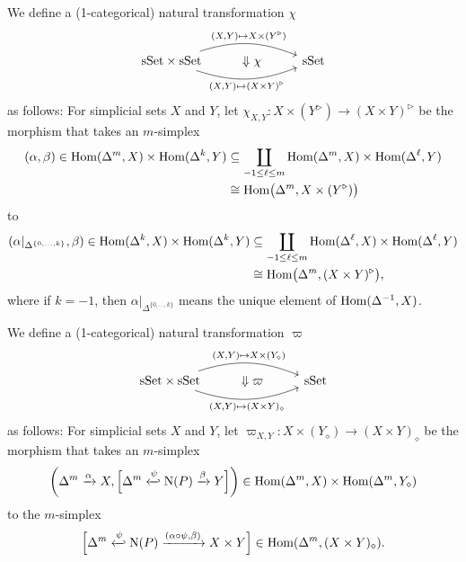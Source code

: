 \documentclass{tac}
\newcommand{\tx}[1]{\textnormal{#1}}
\begin{document}
\begin{construction}\label{prodtrianglerightnattransf} We define a (1-categorical) natural transformation $\chi$
\[\begin{tikzcd} \tx{sSet} \times \tx{sSet} \arrow[bend left=20]{rr}{(X,Y) \mapsto X \times (Y^\triangleright)}  \arrow[bend right=20]{rr}[swap]{(X,Y) \mapsto (X \times Y)^\triangleright} & \Downarrow \chi & \tx{sSet} \end{tikzcd}\]
as follows: For simplicial sets $X$ and $Y$,  let $\chi_{X,Y} : X \times (Y^\triangleright) \to (X \times Y)^\triangleright$ be the morphism that takes an $m$-simplex 
\begin{align*} (\alpha, \beta) \in \tx{Hom}(\Delta^m , X) \times \tx{Hom}(\Delta^k , Y) &\subseteq \coprod_{-1\leq\ell\leq m} \tx{Hom}(\Delta^m , X) \times \tx{Hom}(\Delta^\ell , Y) \\
&  \cong \tx{Hom}\big( \Delta^m , X \times (Y^\triangleright) \big)
\end{align*}
to
\begin{align*} (\alpha |_{\Delta^{\{ 0,\dots , k \}}}, \beta)  \in \tx{Hom}(\Delta^k , X) \times \tx{Hom}(\Delta^k , Y) &\subseteq \coprod_{-1\leq\ell\leq m} \tx{Hom}(\Delta^\ell , X) \times \tx{Hom}(\Delta^\ell , Y) \\
&  \cong \tx{Hom}\big( \Delta^m , (X \times Y)^\triangleright \big),
\end{align*}
where if $k=-1$, then $\alpha |_{\Delta^{\{ 0,\dots , k \}}}$ means the unique element of $\tx{Hom}(\Delta^{-1}, X)$.  
\end{construction}
\begin{construction}\label{diamondprodhelpernattransf} We define a (1-categorical) natural transformation  $\varpi$ 
\[\begin{tikzcd} \tx{sSet} \times \tx{sSet} \arrow[bend left=20]{rr}{(X,Y) \mapsto X \times (Y_\diamond )}  \arrow[bend right=20]{rr}[swap]{(X,Y) \mapsto (X \times Y)_\diamond} & \Downarrow \varpi & \tx{sSet} \end{tikzcd}\]
as follows:  For simplicial sets $X$ and $Y$, let $\varpi_{X,Y} : X \times (Y_\diamond ) \to (X\times Y)_\diamond$ be the morphism that takes an $m$-simplex
\[ \left(  \Delta^m \xrightarrow{\alpha} X , \Big[ \Delta^m \xhookleftarrow{\psi} \tx{N}(P) \xrightarrow{\beta} Y \Big]  \right) \in \tx{Hom}(\Delta^m, X ) \times \tx{Hom}(\Delta^m , Y_\diamond ) \]
to the $m$-simplex 
\[ \Big[  \Delta^m \xhookleftarrow{\psi} \tx{N}(P) \xrightarrow{(\alpha\circ\psi, \beta)} X\times Y \Big] \in \tx{Hom}(\Delta^m , (X\times Y)_\diamond ). \]
\end{construction}
\end{document}
